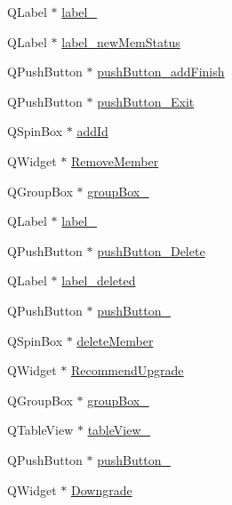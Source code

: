 \begin{DoxyCompactItemize}
\item 
Q\+Label $\ast$ \hyperlink{class_ui___main_window_a13936e6f18b1c90402b3c7a3c92b6cdb}{label\+\_}
\item 
Q\+Label $\ast$ \hyperlink{class_ui___main_window_aeff2ff10f32ae10cbcc7ff8b54635a29}{label\+\_\+new\+Mem\+Status}
\item 
Q\+Push\+Button $\ast$ \hyperlink{class_ui___main_window_ad4c31faf889667927f405fcfec8c7133}{push\+Button\+\_\+add\+Finish}
\item 
Q\+Push\+Button $\ast$ \hyperlink{class_ui___main_window_a68f3157243b11e6b2fb9914c82fdfeee}{push\+Button\+\_\+\+Exit}
\item 
Q\+Spin\+Box $\ast$ \hyperlink{class_ui___main_window_a21b9ffaffe9f43e30037947687efbdd6}{add\+Id}
\item 
Q\+Widget $\ast$ \hyperlink{class_ui___main_window_ae45052ba6cec195e26b36d302fd6a853}{Remove\+Member}
\item 
Q\+Group\+Box $\ast$ \hyperlink{class_ui___main_window_a115c85e83d902d3de5511c1d15c1814d}{group\+Box\+\_}
\item 
Q\+Label $\ast$ \hyperlink{class_ui___main_window_af183bfbfb9f38bbdd60caf92b15e23dc}{label\+\_}
\item 
Q\+Push\+Button $\ast$ \hyperlink{class_ui___main_window_a3ec0a077f72ddbd76aff3c3fb85d3e20}{push\+Button\+\_\+\+Delete}
\item 
Q\+Label $\ast$ \hyperlink{class_ui___main_window_a6609507b989fa580e337ee5daf91a713}{label\+\_\+deleted}
\item 
Q\+Push\+Button $\ast$ \hyperlink{class_ui___main_window_ac92cce0478c1025ace05ff4f8870bb1c}{push\+Button\+\_}
\item 
Q\+Spin\+Box $\ast$ \hyperlink{class_ui___main_window_a7cc08fb2191e678c9ce34299d5d84711}{delete\+Member}
\item 
Q\+Widget $\ast$ \hyperlink{class_ui___main_window_aab7fb13ac3c1ac1c32de4d66361b3068}{Recommend\+Upgrade}
\item 
Q\+Group\+Box $\ast$ \hyperlink{class_ui___main_window_a3d79eff6c70d7146d95bab88fd5a2858}{group\+Box\+\_}
\item 
Q\+Table\+View $\ast$ \hyperlink{class_ui___main_window_a02ec82be10b17797dd47c8afe9bc58e9}{table\+View\+\_}
\item 
Q\+Push\+Button $\ast$ \hyperlink{class_ui___main_window_a7cb3ecb3146a5e71767f4d04963194c8}{push\+Button\+\_}
\item 
Q\+Widget $\ast$ \hyperlink{class_ui___main_window_aa292ae4e1e8470a71925b135cceca1c2}{Downgrade}

\end{DoxyCompactItemize}
